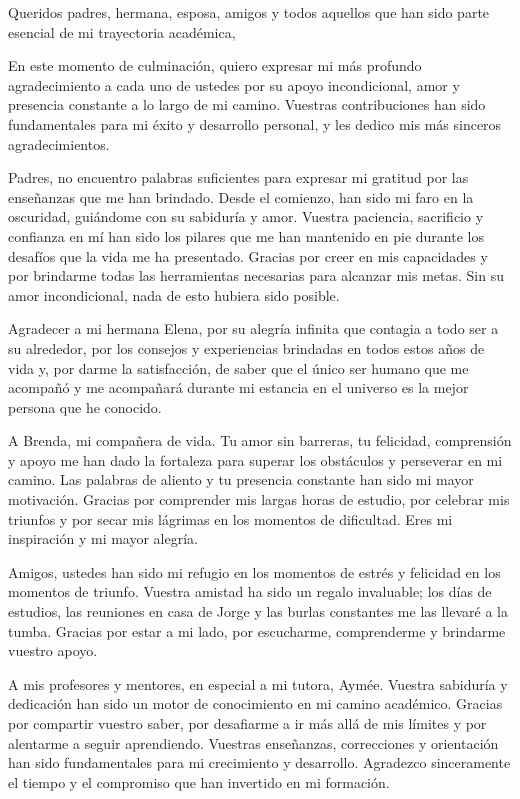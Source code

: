 \begin{acknowledgements}
    Queridos padres, hermana, esposa, amigos y todos aquellos que han sido parte esencial de mi trayectoria académica,

    En este momento de culminación, quiero expresar mi más profundo agradecimiento a cada uno de ustedes por 
    su apoyo incondicional, amor y presencia constante a lo largo de mi camino. Vuestras contribuciones han 
    sido fundamentales para mi éxito y desarrollo personal, y les dedico mis más sinceros agradecimientos.

    Padres, no encuentro palabras suficientes para expresar mi gratitud por las enseñanzas que me 
    han brindado. Desde el comienzo, han sido mi faro en la oscuridad, guiándome con su sabiduría y amor. Vuestra 
    paciencia, sacrificio y confianza en mí han sido los pilares que me han mantenido en pie durante los 
    desafíos que la vida me ha presentado. Gracias por creer en mis capacidades y por brindarme todas las herramientas 
    necesarias para alcanzar mis metas. Sin su amor incondicional, nada de esto hubiera sido posible.

    Agradecer a mi hermana Elena, por su alegría infinita que contagia a todo ser a su alrededor, por los consejos
    y experiencias brindadas en todos estos años de vida y, por darme la satisfacción, de saber que el único ser humano
    que me acompañó y me acompañará durante mi estancia en el universo es la mejor persona que he conocido.

    A Brenda, mi compañera de vida. Tu amor sin barreras, tu felicidad, 
    comprensión y apoyo me han dado la fortaleza para superar los obstáculos y perseverar en mi camino. 
    Las palabras de aliento y tu presencia constante han sido mi mayor motivación. Gracias por comprender 
    mis largas horas de estudio, por celebrar mis triunfos y por secar mis lágrimas en los momentos de 
    dificultad. Eres mi inspiración y mi mayor alegría.

    Amigos, ustedes han sido mi refugio en los momentos de estrés y felicidad en los momentos de 
    triunfo. Vuestra amistad ha sido un regalo invaluable; los días de estudios, las reuniones en casa de 
    Jorge y las burlas constantes me las llevaré a la tumba. Gracias por estar a mi lado, 
    por escucharme, comprenderme y brindarme vuestro apoyo.

    A mis profesores y mentores, en especial a mi tutora, Aymée. Vuestra sabiduría y dedicación han 
    sido un motor de conocimiento en mi camino académico. Gracias por compartir vuestro saber, por 
    desafiarme a ir más allá de mis límites y por alentarme a seguir aprendiendo. Vuestras enseñanzas, 
    correcciones y orientación han sido fundamentales para mi crecimiento y desarrollo. Agradezco 
    sinceramente el tiempo y el compromiso que han invertido en mi formación.
\end{acknowledgements}